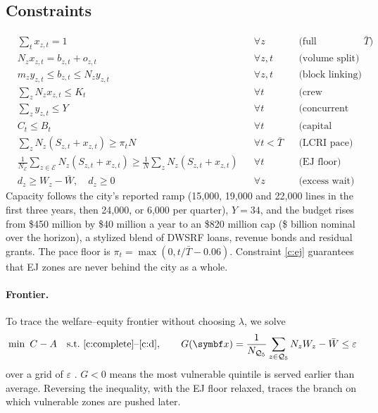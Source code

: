 \documentclass[11pt]{article}
\newcommand{\EJ}{\mathcal{E}}
\newcommand{\Qf}{\mathcal{Q}_5}
\begin{document}
\subsection{Constraints}
\begin{align}
&\textstyle\sum_tx_{z,t}=1 && \forall z && \text{(full replacement by }\bar T)\label{c:complete}\\
&N_zx_{z,t}=b_{z,t}+o_{z,t} && \forall z,t && \text{(volume split)}\label{c:split}\\
&m_zy_{z,t}\leq b_{z,t}\leq N_zy_{z,t} && \forall z,t && \text{(block linking)}\label{c:link}\\
&\textstyle\sum_zN_zx_{z,t}\leq K_t && \forall t && \text{(crew capacity)}\label{c:cap}\\
&\textstyle\sum_zy_{z,t}\leq Y && \forall t && \text{(concurrent block crews)}\label{c:crew}\\
&C_t\leq B_t && \forall t && \text{(capital budget)}\label{c:budget}\\
&\textstyle\sum_zN_z(S_{z,t}+x_{z,t})\geq\pi_tN && \forall t<\bar T && \text{(LCRI pace)}\label{c:pace}\\
&\tfrac{1}{N_{\EJ}}\textstyle\sum_{z\in\EJ}N_z(S_{z,t}+x_{z,t})\geq\tfrac1N\sum_zN_z(S_{z,t}+x_{z,t}) && \forall t && \text{(EJ floor)}\label{c:ej}\\
&d_z\geq W_z-\bar W,\quad d_z\geq0 && \forall z && \text{(excess wait)}\label{c:d}
\end{align}
Capacity follows the city's reported ramp (15,000, 19,000 and 22,000 lines in the first three years,
then 24,000, or 6,000 per quarter), $Y=34$, and the budget rises from \$450 million by \$40 million a
year to an \$820 million cap (\$\TotalBudget{} billion nominal over the horizon), a stylized blend of
DWSRF loans, revenue bonds and residual grants. The pace floor is $\pi_t=\max(0,t/\bar T-0.06)$.
Constraint \eqref{c:ej} guarantees that EJ zones are never behind the city as a whole.

\paragraph{Frontier.} To trace the welfare--equity frontier without choosing $\lambda$, we solve
\begin{equation}
\min\ C-A\quad\text{s.t.\ \eqref{c:complete}--\eqref{c:d}},\qquad
G(\symbf x)=\frac{1}{N_{\Qf}}\sum_{z\in\Qf}N_zW_z-\bar W\leq\varepsilon \label{eq:eps}
\end{equation}
over a grid of $\varepsilon$ \citep{haimes1971,mavrotas2009,ehrgott2005}. $G<0$ means the most
vulnerable quintile is served earlier than average. Reversing the inequality, with the EJ floor
relaxed, traces the branch on which vulnerable zones are pushed later.
\end{document}
